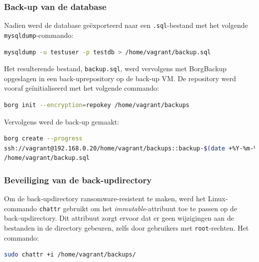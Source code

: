 \subsubsection{Back-up van de database}
Nadien werd de database geëxporteerd naar een \texttt{.sql}-bestand met het volgende \texttt{mysqldump}-commando:
\begin{lstlisting}[language=bash, caption={mysqldump commando om een databank te exporteren}]
mysqldump -u testuser -p testdb > /home/vagrant/backup.sql
\end{lstlisting}
Het resulterende bestand, \texttt{backup.sql}, werd vervolgens met BorgBackup opgeslagen in een back-uprepository op de back-up VM. De repository werd vooraf geïnitialiseerd met het volgende commando:
\begin{lstlisting}[language=bash, caption={Borg commando om een map te initialiseren als Borg repository}]
borg init --encryption=repokey /home/vagrant/backups
\end{lstlisting}
Vervolgens werd de back-up gemaakt:
\begin{lstlisting}[language=bash, caption={Borg commando om een back-up te nemen}]
borg create --progress 
ssh://vagrant@192.168.0.20/home/vagrant/backups::backup-$(date +%Y-%m-%d) 
/home/vagrant/backup.sql
\end{lstlisting}

\subsubsection{Beveiliging van de back-updirectory}
Om de back-updirectory ransomware-resistent te maken, werd het Linux-commando \texttt{chattr} gebruikt om het \textit{immutable}-attribuut toe te passen op de back-updirectory. Dit attribuut zorgt ervoor dat er geen wijzigingen aan de bestanden in de directory gebeuren, zelfs door gebruikers met \texttt{root}-rechten. Het commando:
\begin{lstlisting}[language=bash, caption={Linux commando om de map immutable te maken}]
sudo chattr +i /home/vagrant/backups/
\end{lstlisting}


